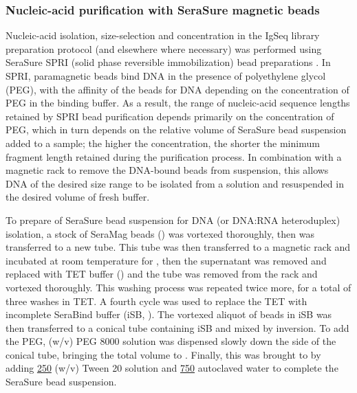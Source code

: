 \subsubsection{Nucleic-acid purification with SeraSure magnetic beads}
\label{sec:methods_molec_standard_serasure}


Nucleic-acid isolation, size-selection and concentration in the IgSeq library preparation protocol (and elsewhere where necessary) was performed using SeraSure SPRI (solid phase reversible immobilization) bead preparations \parencite{hawkins1994spri,deangelis1995spri,lennon2010cleanup,fisher2011cleanup}. In SPRI, paramagnetic beads bind DNA in the presence of polyethylene glycol (PEG), with the affinity of the beads for DNA depending on the concentration of PEG in the binding buffer. As a result, the range of nucleic-acid sequence lengths retained by SPRI bead purification depends primarily on the concentration of PEG, which in turn depends on the relative volume of SeraSure bead suspension added to a sample; the higher the concentration, the shorter the minimum fragment length retained during the purification process. In combination with a magnetic rack to remove the DNA-bound beads from suspension, this allows DNA of the desired size range to be isolated from a solution and resuspended in the desired volume of fresh buffer.

To prepare  of SeraSure bead suspension for DNA (or DNA:RNA heteroduplex) isolation, a stock of SeraMag beads () was vortexed thoroughly, then  was transferred to a new tube. This tube was then transferred to a magnetic rack and incubated at room temperature for , then the supernatant was removed and replaced with  TET buffer () and the tube was removed from the rack and vortexed thoroughly. This washing process was repeated twice more, for a total of three washes in TET. A fourth cycle was used to replace the TET with incomplete SeraBind buffer (iSB, ). The vortexed  aliquot of beads in iSB was then transferred to a conical tube containing  iSB and mixed by inversion. To add the PEG,   (w/v) PEG 8000 solution was dispensed slowly down the side of the conical tube, bringing the total volume to . Finally, this was brought to  by adding \ul{250}  (w/v) Tween 20 solution and \ul{750} autoclaved water to complete the SeraSure bead suspension.


